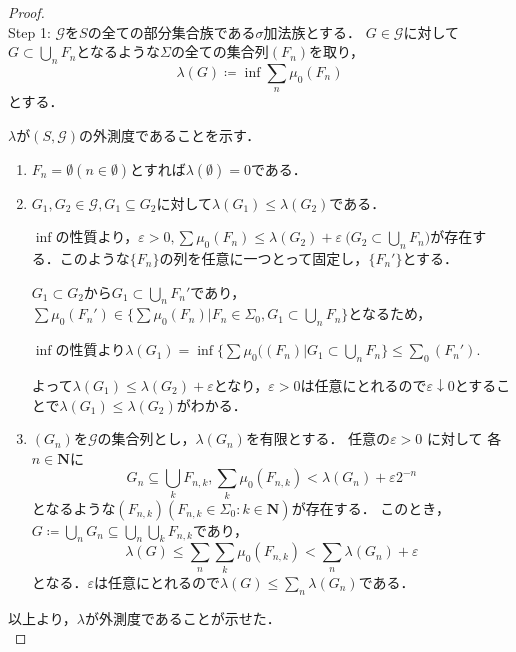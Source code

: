 \documentclass{jsarticle}
\begin{document}
\begin{proof} \mbox{}\\
Step 1:
$\mathcal{G}$を$S$の全ての部分集合族である$\sigma$加法族とする．
$G\in\mathcal{G}$に対して$G\subset\bigcup_n F_n$となるような$\Sigma$の全ての集合列$(F_n)$を取り，
\begin{equation}
    \lambda(G) \coloneqq \inf\sum_n \mu_0(F_n)
\end{equation}
とする．

$\lambda$が$(S,\mathcal{G})$の外測度であることを示す．
\begin{enumerate}
    \item $F_n=\emptyset(n\in\emptyset)$とすれば$\lambda(\emptyset)=0$である．
    \item $G_1,G_2\in \mathcal{G},G_1\subseteq G_2$に対して$\lambda(G_1)\leq\lambda(G_2)$である．
        \begin{itembox}{}
            $\inf$の性質より，$\varepsilon>0,\sum\mu_0(F_n)\leq\lambda(G_2)+\varepsilon\ \bigr(G_2\subset\bigcup_nF_n\bigl)$が存在する．このような$\{F_n\}$の列を任意に一つとって固定し，$\{F_n'\}$とする．
            
            $G_1\subset G_2$から$G_1\subset\bigcup_nF_n'$であり，$\sum\mu_0(F_n')\in\{\sum\mu_0(F_n)|F_n\in\Sigma_0,G_1\subset\bigcup_nF_n\}$となるため，\par
            $\inf$の性質より$\lambda(G_1)=\inf\{\sum\mu_0((F_n)|G_1\subset\bigcup_n F_n\} \leq \sum_0(F_n')$.

            よって$\lambda(G_1)\leq\lambda(G_2)+\varepsilon$となり，$\varepsilon>0$は任意にとれるので$\varepsilon\downarrow 0$とすることで$\lambda(G_1)\leq\lambda(G_2)$がわかる．
        \end{itembox}
    \item $(G_n)$を$\mathcal{G}$の集合列とし，$\lambda(G_n)$を有限とする．
        任意の$\varepsilon>0$ に対して 各$n\in\mathbf{N}$に
        \begin{equation}
            G_n\subseteq\bigcup_k F_{n,k},\sum_k \mu_0(F_{n,k})<\lambda(G_n)+\varepsilon 2^{-n}
        \end{equation}
        となるような$(F_{n,k})(F_{n,k}\in\Sigma_0:k\in\mathbf{N})$が存在する．
        このとき，$G\coloneqq\bigcup_n G_n \subseteq \bigcup_n\bigcup_kF_{n,k}$であり，
        \begin{equation}
            \lambda(G) \leq \sum_n\sum_k\mu_0(F_{n,k}) < \sum_n\lambda(G_n) + \varepsilon \nonumber
        \end{equation}
        となる．$\varepsilon$は任意にとれるので$\lambda(G) \leq \sum_n\lambda(G_n)$である．
\end{enumerate}
以上より，$\lambda$が外測度であることが示せた．
\\


\end{proof}
\end{document}
